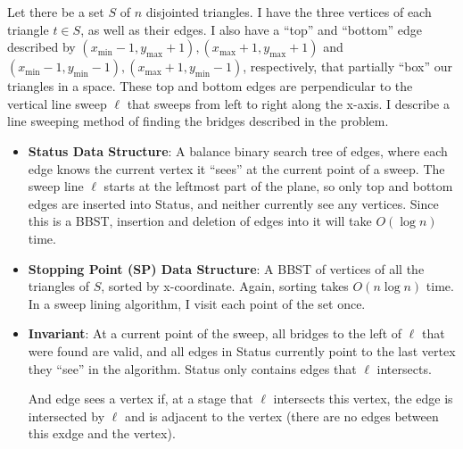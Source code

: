 \documentclass [12pt]{article}
\begin{document}
    Let there be a set $S$ of $n$ disjointed triangles. I have the three vertices of each triangle $t \in S$, as well as their edges. I also have a ``top'' and ``bottom'' edge described by $(x_\text{min} - 1, y_\text{max} + 1), (x_\text{max} + 1, y_\text{max} + 1)$ and $(x_\text{min} - 1, y_\text{min} - 1), (x_\text{max} + 1, y_\text{min} - 1)$, respectively, that partially ``box'' our triangles in a space. These top and bottom edges are perpendicular to the vertical line sweep $\ell$ that sweeps from left to right along the x-axis. I describe a line sweeping method of finding the bridges described in the problem.
        \begin{itemize}
            \item \textbf{Status Data Structure}: A balance binary search tree of edges, where each edge knows the current vertex it ``sees'' at the current point of a sweep. The sweep line $\ell$ starts at the leftmost part of the plane, so only top and bottom edges are inserted into Status, and neither currently see any vertices. Since this is a BBST, insertion and deletion of edges into it will take $O(\log n)$ time. 
            

            \item \textbf{Stopping Point (SP) Data Structure}: A BBST of vertices of all the triangles of $S$, sorted by x-coordinate. Again, sorting takes $O(n\log n)$ time. In a sweep lining algorithm, I visit each point of the set once. 
            

            \item \textbf{Invariant}: At a current point of the sweep, all bridges to the left of $\ell$ that were found are valid, and all edges in Status currently point to the last vertex they ``see'' in the algorithm. Status only contains edges that $\ell$ intersects.
            
            And edge sees a vertex if, at a stage that $\ell$ intersects this vertex, the edge is intersected by $\ell$ and is adjacent to the vertex (there are no edges between this exdge and the vertex). 
        \end{itemize}
\end{document}
